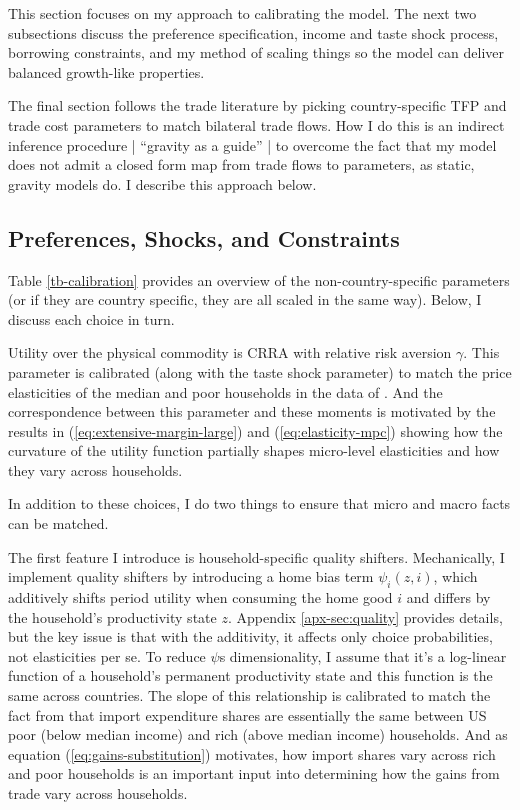 \documentclass[12pt,pdftex]{article}
\begin{document}
\begin{onehalfspacing}
This section focuses on my approach to calibrating the model. The next two subsections discuss the preference specification, income and taste shock process, borrowing constraints, and my method of scaling things so the model can deliver balanced growth-like properties.

The final section follows the trade literature by picking country-specific TFP and trade cost parameters to match bilateral trade flows. How I do this is an indirect inference procedure | ``gravity as a guide'' | to overcome the fact that my model does not admit a closed form map from trade flows to parameters, as static, gravity models do. I describe this approach below.

\subsection{Preferences, Shocks, and Constraints}

Table \ref{tb-calibration} provides an overview of the non-country-specific parameters (or if they are country specific, they are all scaled in the same way). Below, I discuss each choice in turn.

Utility over the physical commodity is CRRA with relative risk aversion $\gamma$. This parameter is calibrated (along with the taste shock parameter) to match the price elasticities of the median and poor households in the data of \citet{auer2022unequal}. And the correspondence between this parameter and these moments is motivated by the results in (\ref{eq:extensive-margin-large}) and (\ref{eq:elasticity-mpc}) showing how the curvature of the utility function partially shapes micro-level elasticities and how they vary across households.

In addition to these choices, I do two things to ensure that micro and macro facts can be matched.

The first feature I introduce is household-specific quality shifters. Mechanically, I implement quality shifters by introducing a home bias term $\psi_{i}(z,i)$, which additively shifts period utility when consuming the home good $i$ and differs by the household's productivity state $z$. Appendix \ref{apx-sec:quality} provides details, but the key issue is that with the additivity, it affects only choice probabilities, not elasticities per se. To reduce $\psi$s dimensionality, I assume that it's a log-linear function of a household's permanent productivity state and this function is the same across countries. The slope of this relationship is calibrated to match the fact from \citet{borusyak2021distributional} that import expenditure shares are essentially the same between US poor (below median income) and rich (above median income) households. And as equation (\ref{eq:gains-substitution}) motivates, how import shares vary across rich and poor households is an important input into determining how the gains from trade vary across households.


\end{onehalfspacing}
\end{document}
